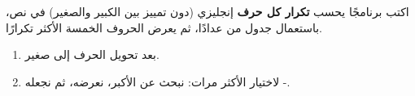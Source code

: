 \begin{statement}
اكتب برنامجًا يحسب \textbf{تكرار كل حرف} إنجليزي (دون تمييز بين الكبير والصغير) في نص، باستعمال جدول من  عدادًا، ثم يعرض الحروف الخمسة الأكثر تكرارًا.
\end{statement}
\begin{stepsbox}\begin{enumerate}
\item {} بعد تحويل الحرف إلى صغير.
\item لاختيار الأكثر  مرات: نبحث عن الأكبر، نعرضه، ثم نجعله -.
\end{enumerate}\end{stepsbox}
